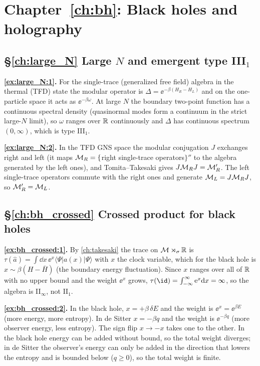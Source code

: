 {\section*{Chapter~\ref{ch:bh}: Black holes and holography}

\subsection*{\S\ref{ch:large_N} Large $N$ and emergent type III$_1$}
\textbf{\ref{ex:large_N:1}.} For the single-trace (generalized free field) algebra in the thermal (TFD) state the modular operator is $\Delta=\ee^{-\beta(H_R-H_L)}$ and on the one-particle space it acts as $\ee^{-\beta\omega}$. At large $N$ the boundary two-point function has a continuous spectral density (quasinormal modes form a continuum in the strict large-$N$ limit), so $\omega$ ranges over $\mathbb{R}$ continuously and $\Delta$ has continuous spectrum $(0,\infty)$, which is type III$_1$.\par
\textbf{\ref{ex:large_N:2}.} In the TFD GNS space the modular conjugation $J$ exchanges right and left (it maps $\mathcal{M}_R=\{$right single-trace operators$\}''$ to the algebra generated by the left ones), and Tomita--Takesaki gives $J\mathcal{M}_RJ=\mathcal{M}_R'$. The left single-trace operators commute with the right ones and generate $\mathcal{M}_L=J\mathcal{M}_RJ$, so $\mathcal{M}_R'=\mathcal{M}_L$.\par

\subsection*{\S\ref{ch:bh_crossed} Crossed product for black holes}
\textbf{\ref{ex:bh_crossed:1}.} By \cref{ch:takesaki} the trace on $\mathcal{M}\rtimes_\sigma\mathbb{R}$ is $\tau(\hat a)=\int\dd x\,\ee^{x}\langle\Psi|a(x)|\Psi\rangle$ with $x$ the clock variable, which for the black hole is $x\sim\beta(H-\bar H)$ (the boundary energy fluctuation). Since $x$ ranges over all of $\mathbb{R}$ with no upper bound and the weight $\ee^x$ grows, $\tau(\id)=\int_{-\infty}^{\infty}\ee^x\dd x=\infty$, so the algebra is II$_\infty$, not II$_1$.\par
\textbf{\ref{ex:bh_crossed:2}.} In the black hole, $x=+\beta\,\delta E$ and the weight is $\ee^{x}=\ee^{\beta E}$ (more energy, more entropy). In de Sitter $x=-\beta q$ and the weight is $\ee^{-\beta q}$ (more observer energy, less entropy). The sign flip $x\to-x$ takes one to the other. In the black hole energy can be added without bound, so the total weight diverges; in de Sitter the observer's energy can only be added in the direction that lowers the entropy and is bounded below ($q\ge0$), so the total weight is finite.\par

}
